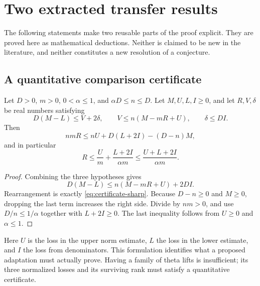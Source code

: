 \section{Two extracted transfer results}\label{sec:lemmas}

The following statements make two reusable parts of the proof explicit. They are proved here as mathematical deductions. Neither is claimed to be new in the literature, and neither constitutes a new resolution of a conjecture.

\subsection{A quantitative comparison certificate}\label{sec:certificate}

\begin{proposition}\label{prop:certificate}
Let \(D>0\), \(m>0\), \(0<\alpha\le1\), and \(\alpha D\le n\le D\). Let \(M,U,L,I\ge0\), and let \(R,V,\delta\) be real numbers satisfying
\begin{equation}\label{eq:certificate-inputs}
D(M-L)\le V+2\delta,\qquad
V\le n(M-mR+U),\qquad
\delta\le DI.
\end{equation}
Then
\begin{equation}\label{eq:certificate-sharp}
nmR\le nU+D(L+2I)-(D-n)M,
\end{equation}
and in particular
\begin{equation}\label{eq:certificate}
R\le\frac{U}{m}+\frac{L+2I}{\alpha m}
\le\frac{U+L+2I}{\alpha m}.
\end{equation}
\end{proposition}

\begin{proof}
Combining the three hypotheses gives
\[
D(M-L)\le n(M-mR+U)+2DI.
\]
Rearrangement is exactly \eqref{eq:certificate-sharp}. Because \(D-n\ge0\) and \(M\ge0\), dropping the last term increases the right side. Divide by \(nm>0\), and use \(D/n\le1/\alpha\) together with \(L+2I\ge0\). The last inequality follows from \(U\ge0\) and \(\alpha\le1\).
\end{proof}

Here \(U\) is the loss in the upper norm estimate, \(L\) the loss in the lower estimate, and \(I\) the loss from denominators. This formulation identifies what a proposed adaptation must actually prove. Having a family of theta lifts is insufficient; its three normalized losses and its surviving rank must satisfy a quantitative certificate.

